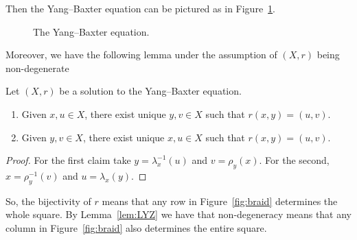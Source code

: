     Then the Yang--Baxter equation can be pictured as in Figure~\ref{fig:YangBaxter}.

    \begin{figure}
        \centering
        \hspace{.5cm}
        \caption{The Yang--Baxter equation.}
        \label{fig:YangBaxter}
    \end{figure}

    Moreover, we have the following lemma under the assumption of $(X,r)$ being non-degenerate 
    
    \begin{lemma}
    \label{lem:LYZ}
        Let $(X,r)$ be a solution to the Yang--Baxter equation. 
        \begin{enumerate}
            \item Given $x,u\in X$, there exist unique $y,v\in X$ such that $r(x,y)=(u,v)$. 
            \item Given $y,v\in X$, there exist unique $x,u\in X$ such that $r(x,y)=(u,v)$. 
        \end{enumerate}
    \end{lemma}
    \begin{proof}
        For the first claim take $y=\lambda_x^{-1}(u)$ and $v=\rho_y(x)$. 
        For the second, $x=\rho_y^{-1}(v)$ and $u=\lambda_x(y)$. 
    \end{proof}

    So, the bijectivity of $r$ means that any row in Figure~\ref{fig:braid} determines the whole square. By Lemma~\ref{lem:LYZ} we have that non-degeneracy means that any column in Figure~\ref{fig:braid} also determines the entire square. 

